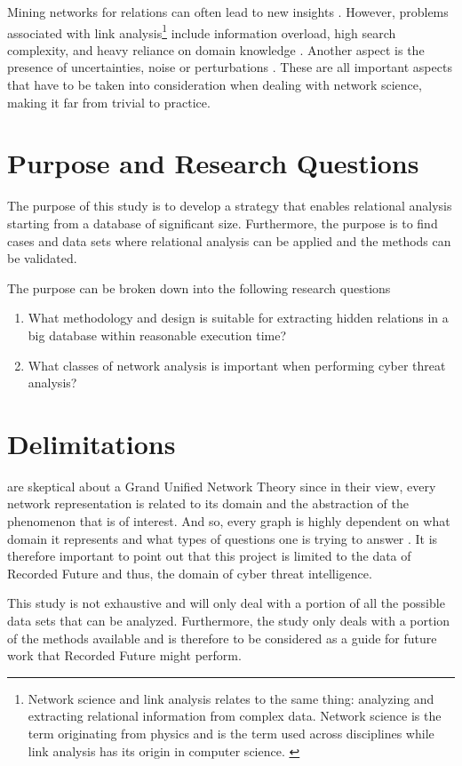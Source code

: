 Mining networks for relations can often lead to new insights \cite{hendrix2010}. However, problems associated with link analysis\footnote{Network science and link analysis relates to the same thing: analyzing and extracting relational information from complex data. Network science is the term originating from physics and is the term used across disciplines while link analysis has its origin in computer science. \cite{fouss2016algorithms}} include information overload, high search complexity, and heavy reliance on domain knowledge \cite{hendrix2010,schroeder2007}. Another aspect is the presence of uncertainties, noise or perturbations \cite{hendrix2010}. These are all important aspects that have to be taken into consideration when dealing with network science, making it far from trivial to practice. 

\section{Purpose and Research Questions}

The purpose of this study is to develop a strategy that enables relational analysis starting from a database of significant size. Furthermore, the purpose is to find cases and data sets where relational analysis can be applied and the methods can be validated. 

The purpose can be broken down into the following research questions
\begin{enumerate}
    \item What methodology and design is suitable for extracting hidden relations in a big database within reasonable execution time?
    \item What classes of network analysis is important when performing cyber threat analysis?
\end{enumerate}

\section{Delimitations}
\citet{brandes2013} are skeptical about a Grand Unified Network Theory since in their view, every network representation is related to its domain and the abstraction of the phenomenon that is of interest. And so, every graph is highly dependent on what domain it represents and what types of questions one is trying to answer \cite{hendrix2010, schroeder2007}. It is therefore important to point out that this project is limited to the data of Recorded Future and thus, the domain of cyber threat intelligence. 

This study is not exhaustive and will only deal with a portion of all the possible data sets that can be analyzed. Furthermore, the study only deals with a portion of the methods available and is therefore to be considered as a guide for future work that Recorded Future might perform.
